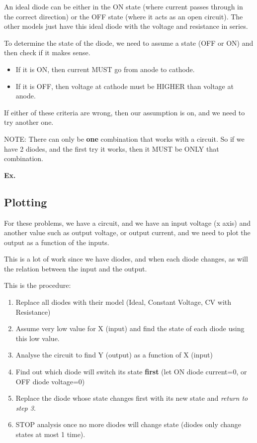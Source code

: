\documentclass[12pt,letterpaper]{article} \usepackage{amsmath} \usepackage{graphicx} \usepackage[margin=1in]{geometry} \usepackage{longtable}  \usepackage{amssymb}
\begin{document}
	An ideal diode can be either in the ON state (where current passes through in the correct direction) or the OFF state (where it acts as an open circuit). The other models just have this ideal diode with the voltage and resistance in series. 
	
	To determine the state of the diode, we need to assume a state (OFF or ON) and then check if it makes sense.
	\begin{itemize}[]
		\item If it is ON, then current MUST go from anode to cathode.
		\item If it is OFF, then voltage at cathode must be HIGHER than voltage at anode. 
	\end{itemize}

	If either of these criteria are wrong, then our assumption is on, and we need to try another one. 
	
	NOTE: There can only be \textbf{one } combination that works with a circuit. So if we have 2 diodes, and the first try it works, then it MUST be ONLY that combination.
	
	\begin{mdframed}[]
		\textbf{Ex. }
	\end{mdframed}
	
	\subsection{Plotting}
	For these problems, we have a circuit, and we have an input voltage (x axis) and another value such as output voltage, or output current, and we need to plot the output as a function of the inputs. 
	
	This is a lot of work since we have diodes, and when each diode changes, as will the relation between the input and the output. 
	
	This is the procedure: 
	\begin{enumerate}[noitemsep]
		\item Replace all diodes with their model (Ideal, Constant Voltage, CV with Resistance)
		\item Assume very low value for X (input) and find the state of each diode using this low value.
		\item Analyse the circuit to find Y (output) as a function of X (input)
		\item Find out which diode will switch its state \textbf{first }(let ON diode current=0, or OFF diode voltage=0)
		\item Replace the diode whose state changes first with its new state and \textit{return to step 3}. 
		\item STOP analysis once no more diodes will change state (diodes only change states at most 1 time).
	\end{enumerate}
\end{document}
